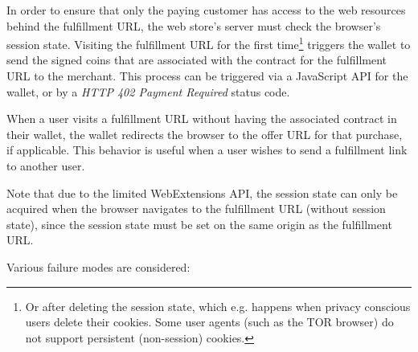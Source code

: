 \documentclass{llncs}
\begin{document}
In order to ensure that only the paying customer has access to the web
resources behind the fulfillment URL, the web store's server must check the
browser's session state.  Visiting the fulfillment URL for the first
time\footnote{Or after deleting the session state, which e.g. happens when
privacy conscious users delete their cookies.  Some user agents (such as the TOR browser)
do not support persistent (non-session) cookies.} triggers the wallet to send the
signed coins that are associated with the contract for the fulfillment URL to
the merchant.  This process can be triggered via a JavaScript API for the
wallet, or by a \emph{HTTP 402 Payment Required} status code.

When a user visits a fulfillment URL without having the associated contract
in their wallet, the wallet redirects the browser to the offer URL for that
purchase, if applicable.  This behavior is useful when a user wishes to
send a fulfillment link to another user.

Note that due to the limited WebExtensions API, the session
state can only be acquired when the browser navigates to
the fulfillment URL (without session state), since the session
state must be set on the same origin as the fulfillment URL.

Various failure modes are considered:
\end{document}
